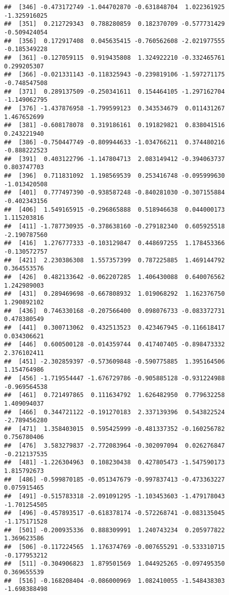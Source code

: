 \documentclass[
]{article}
\begin{document}
\begin{verbatim}
##  [346] -0.473172749 -1.044702870 -0.631848704  1.022361925 -1.325916025
##  [351]  0.212729343  0.788280859  0.182370709 -0.577731429 -0.509424054
##  [356]  0.172917408  0.045635415 -0.760562608 -2.021977555 -0.185349228
##  [361] -0.127059115  0.919435808  1.324922210 -0.332465761  0.299205307
##  [366] -0.021331143 -0.118325943 -0.239819106 -1.597271175 -0.748547508
##  [371]  0.289137509 -0.250341611  0.154464105 -1.297162704 -1.149062795
##  [376] -1.437876958 -1.799599123  0.343534679  0.011431267  1.467652699
##  [381] -0.608178078  0.319186161  0.191829821  0.838041516  0.243221940
##  [386] -0.750447749 -0.809944633 -1.034766211  0.374480216 -0.888222523
##  [391]  0.403122796 -1.147804713  2.083149412 -0.394063737  0.803747703
##  [396]  0.711831092  1.198569539  0.253416748 -0.095999630 -1.013420508
##  [401]  0.777497390 -0.938587248 -0.840281030 -0.307155884 -0.402343156
##  [406]  1.549165915 -0.296865888  0.518946638  0.044000173  1.115203816
##  [411] -1.787730935 -0.378638160 -0.279182340  0.605925518 -2.190787560
##  [416]  1.276777333 -0.103129847  0.448697255  1.178453366 -0.130572757
##  [421]  2.230386308  1.557357399  0.787225885  1.469144792  0.364553576
##  [426]  0.482133642 -0.062207285  1.406430088  0.640076562  1.242989003
##  [431]  0.289469698 -0.667808932  1.019068292  1.162376750  1.290892102
##  [436]  0.746330168 -0.207566400  0.098076733 -0.083372731  0.478380549
##  [441]  0.300713062  0.432513523  0.423467945 -0.116618417  0.034306621
##  [446]  0.600500128 -0.014359744  0.417407405 -0.898473332  2.376102411
##  [451] -2.302859397 -0.573609848 -0.590775885  1.395164506  1.154764986
##  [456] -1.719554447 -1.676729786 -0.905885128 -0.931224988 -0.969564538
##  [461]  0.721497865  0.111634792  1.626482950  0.779632258  1.409094037
##  [466]  0.344721122 -0.191270183  2.337139396  0.543822524 -2.789456280
##  [471]  1.358403015  0.595425999 -0.481337352 -0.160256782  0.756780406
##  [476]  3.583279837 -2.772083964 -0.302097094  0.026276847 -0.212137535
##  [481] -1.226304963  0.108230438  0.427805473 -1.547590173  1.815792673
##  [486] -0.599870185 -0.051347679 -0.997837413 -0.473363227  0.075915465
##  [491] -0.515783318 -2.091091295 -1.103453603 -1.479178043 -1.701254505
##  [496] -0.457893517 -0.618378174 -0.572268741 -0.083135045 -1.175171528
##  [501] -0.200935336  0.888309991  1.240743234  0.205977822  1.369623586
##  [506] -0.117224565  1.176374769 -0.007655291 -0.533310715 -0.177953212
##  [511] -0.304906823  1.879501569  1.044925265 -0.097495350  0.369655539
##  [516] -0.168208404 -0.086000969  1.082410055 -1.548438303 -1.698388498

\end{verbatim}
\end{document}
